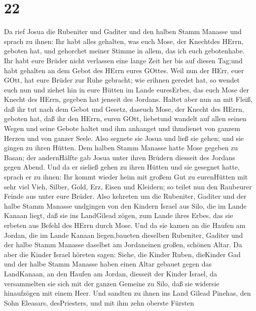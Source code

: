 \hypertarget{section-21}{%
\section{22}\label{section-21}}

 Da rief Josua die Rubeniter und Gaditer und den halben
Stamm Manasse  und sprach zu ihnen: Ihr habt alles gehalten,
was euch Mose, der Knechtdes HErrn, geboten hat, und gehorchet meiner
Stimme in allem, das ich euch gebotenhabe.  Ihr habt eure
Brüder nicht verlassen eine lange Zeit her bis auf diesen Tag;und habt
gehalten an dem Gebot des HErrn eures GOttes.  Weil nun der
HErr, euer GOtt, hat eure Brüder zur Ruhe gebracht; wie erihnen geredet
hat, so wendet euch nun und ziehet hin in eure Hütten im Lande
euresErbes, das euch Mose der Knecht des HErrn, gegeben hat jenseit des
Jordans.  Haltet aber nun an mit Fleiß, daß ihr tut nach dem
Gebot und Gesetz, daseuch Mose, der Knecht des HErrn, geboten hat, daß
ihr den HErrn, euren GOtt, liebetund wandelt auf allen seinen Wegen und
seine Gebote haltet und ihm anhanget und ihmdienet von ganzem Herzen und
von ganzer Seele.  Also segnete sie Josua und ließ sie
gehen; und sie gingen zu ihren Hütten.  Dem halben Stamm
Manasse hatte Mose gegeben zu Basan; der andernHälfte gab Josua unter
ihren Brüdern diesseit des Jordans gegen Abend. Und da er sieließ gehen
zu ihren Hütten und sie gesegnet hatte,  sprach er zu ihnen:
Ihr kommt wieder heim mit großem Gut zu eurenHütten mit sehr viel Vieh,
Silber, Gold, Erz, Eisen und Kleidern; so teilet nun den Raubeurer
Feinde aus unter eure Brüder.  Also kehreten um die
Rubeniter, Gaditer und der halbe Stamm Manasse undgingen von den Kindern
Israel aus Silo, die im Lande Kanaan liegt, daß sie ins LandGilead
zögen, zum Lande ihres Erbes, das sie erbeten aus Befehl des HErrn durch
Mose.  Und da sie kamen an die Haufen am Jordan, die im
Lande Kanaan liegen,baueten dieselben Rubeniter, Gaditer und der halbe
Stamm Manasse daselbst am Jordaneinen großen, schönen Altar.
 Da aber die Kinder Israel höreten sagen: Siehe, die Kinder
Ruben, dieKinder Gad und der halbe Stamm Manasse haben einen Altar
gebauet gegen das LandKanaan, an den Haufen am Jordan, diesseit der
Kinder Israel,  da versammelten sie sich mit der ganzen
Gemeine zu Silo, daß sie widersie hinaufzögen mit einem Heer.
 Und sandten zu ihnen ins Land Gilead Pinehas, den Sohn
Eleasars, desPriesters,  und mit ihm zehn oberste Fürsten
